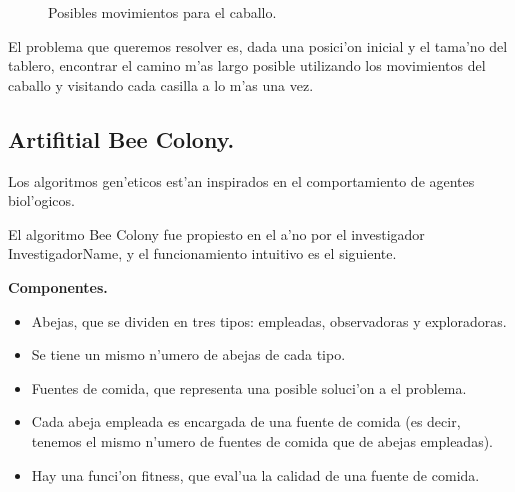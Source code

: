 \documentclass[12pt]{article}
\begin{document}
    \begin{figure}[H]
        \centering
        \caption{Posibles movimientos para el caballo.}
        \label{fig:knight_move}
    \end{figure}



    El problema que queremos resolver es, dada una posici'on inicial y el tama'no del tablero,
    encontrar el camino m'as largo posible utilizando los movimientos del caballo
    y visitando cada casilla a lo m'as una vez.


    \subsection{Artifitial Bee Colony.}\label{section:bee_colony}
    Los algoritmos gen'eticos est'an inspirados en el comportamiento de
    agentes biol'ogicos.

    El algoritmo Bee Colony fue propiesto en el a'no por el investigador InvestigadorName,
    y el funcionamiento intuitivo es el siguiente.

    \textbf{Componentes.}
    \begin{itemize}
        \setlength\itemsep{0em}
        \item Abejas, que se dividen en tres tipos: empleadas, observadoras y exploradoras.
        \item Se tiene un mismo n'umero de abejas de cada tipo.
        \item Fuentes de comida, que representa una posible soluci'on a el problema.
        \item Cada abeja empleada es encargada de una fuente de comida (es decir, tenemos el mismo n'umero de fuentes
                de comida que de abejas empleadas).
        \item Hay una funci'on fitness, que eval'ua la calidad de una fuente de comida.
    \end{itemize}
\end{document}

